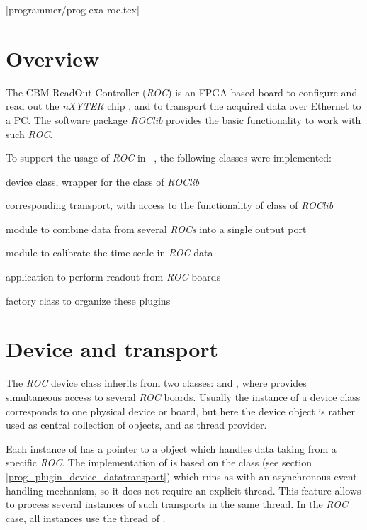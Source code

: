 [programmer/prog-exa-roc.tex]

\section{Overview}

The CBM ReadOut Controller ({\em ROC}) is an FPGA-based board
to configure and read out the
{\em nXYTER} chip \cite{nxyter}, and to transport the acquired data over Ethernet to a PC. 
The software package {\em ROClib} 
provides the basic functionality to work with such {\em ROC}.
 
To support the usage of {\em ROC} in \dabc~, the following classes 
were implemented:
\bbul
\item {}  device class, wrapper for the 
class of {\em ROClib} 
\item {}  corresponding transport, with access to the functionality of  class of {\em ROClib} 
\item {}  module to combine data from several {\em ROCs} into a single output port 
\item {}  module to calibrate the time scale in {\em ROC} data  
\item {}  application to perform readout from {\em ROC} boards   
\item {}  factory class to organize these plugins 
\ebul


\section{Device and transport}

The {\em ROC} device class  inherits from two classes:  and ,
where  provides simultaneous access to several {\em ROC} boards. 
Usually the instance of a device class corresponds to one physical device or board, 
but here the device object is rather used as central collection of  objects, and as thread provider.

Each instance of  has a pointer to a  object
which handles data taking from a specific {\em ROC}. 
The implementation of  is based on the  class (see section \ref{prog_plugin_device_datatransport}) which
runs as  with an asynchronous event handling mechanism,
so it does not require an explicit thread.
This feature allows to process several instances of such transports in the same thread.
In the {\em ROC} case, all  instances use the thread of .   
  
